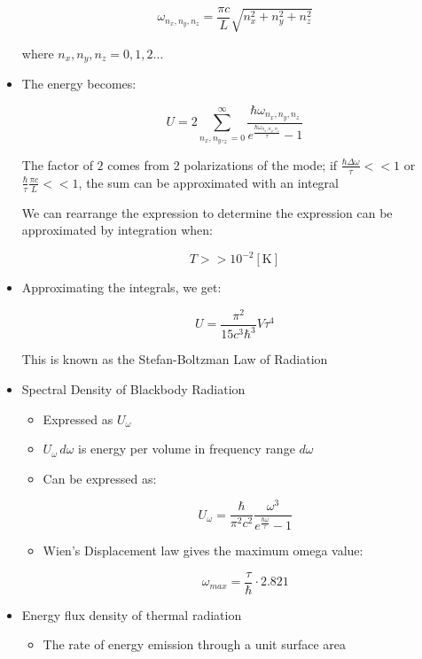 \begin{itemize}
    $$\omega_{n_x,n_y,n_z}=\frac{\pi c}{L}\sqrt{n_x^2+n_y^2+n_z^2}$$

    where $n_x,n_y,n_z=0,1,2\ldots$

  \item The energy becomes:

    $$U=2\sum_{n_x,n_y,_z=0}^{\infty}\frac{\hbar\omega_{n_x,n_y,n_z}}{e^{\frac{\hbar\omega_{n_x,n_y,n_z}}{\tau}}-1}$$

    The factor of $2$ comes from 2 polarizations of the mode; if $\frac{\hbar\Delta \omega}{\tau} << 1$ or $\frac{\hbar}{\tau}\frac{\pi c}{L} << 1$, the sum can be approximated with an integral

    We can rearrange the expression to determine the expression can be approximated by integration when:

    $$T>>10^{-2}[\si{\kelvin}]$$

  \item Approximating the integrals, we get:

    $$\boxed{U=\frac{\pi^2}{15c^3\hbar^3}V\tau^4}$$

      This is known as the Stefan-Boltzman Law of Radiation

    \item Spectral Density of Blackbody Radiation

      \begin{itemize}

        \item Expressed as $U_{\omega}$

        \item $U_{\omega}\,d\omega$ is energy per volume in frequency range $d\omega$

        \item Can be expressed as:

        $$\boxed{U_{\omega}=\frac{\hbar}{\pi^2c^2}\frac{\omega^3}{e^{\frac{\hbar\omega}{\tau}}-1}}$$

      \item Wien's Displacement law gives the maximum omega value:

        $$\omega_{max}=\frac{\tau}{\hbar}\cdot2.821$$

      \end{itemize}

    \item Energy flux density of thermal radiation

      \begin{itemize}
          
        \item The rate of energy emission through a unit surface area


\end{itemize}
\end{itemize}
